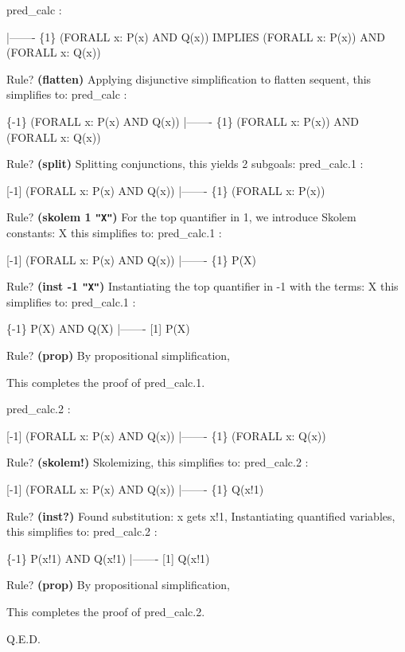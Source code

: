 \begin{pvsscript}
    pred_calc :   

      |-------
    \{1\}   (FORALL x: P(x) AND Q(x)) IMPLIES (FORALL x: P(x)) AND (FORALL x: Q(x))

    Rule? {\bf (flatten)}
    Applying disjunctive simplification to flatten sequent,
    this simplifies to: 
    pred_calc :   

    \{-1\}   (FORALL x: P(x) AND Q(x))
      |-------
    \{1\}   (FORALL x: P(x)) AND (FORALL x: Q(x))

    Rule? {\bf (split)}
    Splitting conjunctions,
    this yields  2 subgoals: 
    pred_calc.1 :   

    [-1]   (FORALL x: P(x) AND Q(x))
      |-------
    \{1\}   (FORALL x: P(x))

    Rule? {\bf (skolem 1 {\tt "X"})}
    For the top quantifier in 1, we introduce Skolem constants: X
    this simplifies to: 
    pred_calc.1 :   

    [-1]   (FORALL x: P(x) AND Q(x))
      |-------
    \{1\}   P(X)

    Rule? {\bf (inst -1 {\tt "X"})}
    Instantiating the top quantifier in -1 with the terms: 
     X
    this simplifies to: 
    pred_calc.1 :   

    \{-1\}   P(X) AND Q(X)
      |-------
    [1]   P(X)

    Rule? {\bf (prop)}
    By propositional simplification,

    This completes the proof of pred_calc.1.

    pred_calc.2 :   

    [-1]   (FORALL x: P(x) AND Q(x))
      |-------
    \{1\}   (FORALL x: Q(x))

    Rule? {\bf (skolem!)}
    Skolemizing,
    this simplifies to: 
    pred_calc.2 :   

    [-1]   (FORALL x: P(x) AND Q(x))
      |-------
    \{1\}   Q(x!1)

    Rule? {\bf (inst?)}
    Found substitution:
    x gets x!1,
    Instantiating quantified variables,
    this simplifies to: 
    pred_calc.2 :   

    \{-1\}   P(x!1) AND Q(x!1)
      |-------
    [1]   Q(x!1)

    Rule? {\bf (prop)}
    By propositional simplification,

    This completes the proof of pred_calc.2.

    Q.E.D.
\end{pvsscript}

